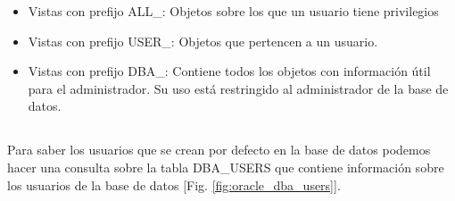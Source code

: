 \documentclass[10pt,a4paper]{article}
\begin{document}
\begin{itemize}
\item Vistas con prefijo ALL\_: Objetos sobre los que un usuario tiene privilegios
\item Vistas con prefijo USER\_: Objetos que pertencen a un usuario.
\item Vistas con prefijo DBA\_: Contiene todos los objetos con información útil para el administrador. Su uso está restringido al administrador de la base de datos.
\end{itemize}

\subsection{}
Para saber los usuarios que se crean por defecto en la base de datos podemos hacer una consulta sobre la tabla DBA\_USERS que contiene información sobre los usuarios de la base de datos [Fig. \ref{fig:oracle_dba_users}].
\end{document}

